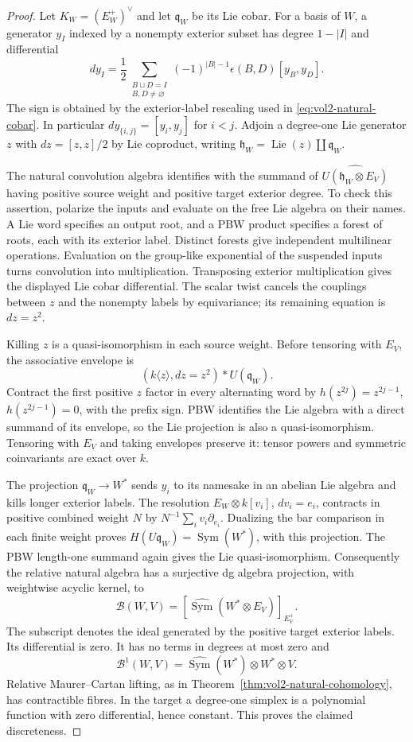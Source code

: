 \begin{proof}
Let $K_W=(E_W^+)^\vee$ and let $\mathfrak q_W$ be its Lie
cobar. For a basis of $W$, a generator $y_I$ indexed by a
nonempty exterior subset has degree $1-|I|$ and differential
\[
 dy_I=\frac12\sum_{\substack{B\sqcup D=I\\B,D\ne\varnothing}}
       (-1)^{|B|-1}\epsilon(B,D)[y_B,y_D].
\]
The sign is obtained by the exterior-label rescaling used in
\eqref{eq:vol2-natural-cobar}. In particular
$dy_{\{i,j\}}=[y_i,y_j]$ for $i<j$.
Adjoin a degree-one Lie generator $z$ with
$dz=[z,z]/2$ by Lie coproduct, writing
$\mathfrak h_W=\operatorname{Lie}(z)\amalg\mathfrak q_W$.

The natural convolution algebra identifies with the summand
of $\widehat{U(\mathfrak h_W\otimes E_V)}$ having positive
source weight and positive target exterior degree. To check
this assertion, polarize the inputs and evaluate on the free
Lie algebra on their names. A Lie word specifies an output
root, and a PBW product specifies a forest of roots, each with
its exterior label. Distinct forests give independent
multilinear operations. Evaluation on the group-like exponential
of the suspended inputs turns convolution into multiplication.
Transposing exterior multiplication gives the displayed Lie
cobar differential. The scalar twist cancels the couplings
between $z$ and the nonempty labels by equivariance; its
remaining equation is $dz=z^2$.

Killing $z$ is a quasi-isomorphism in each source weight.
Before tensoring with $E_V$, the associative envelope is
\[
 (k\langle z\rangle,dz=z^2)*U(\mathfrak q_W).
\]
Contract the first positive $z$ factor in every alternating
word by $h(z^{2j})=z^{2j-1}$, $h(z^{2j-1})=0$, with the
prefix sign. PBW identifies the Lie algebra with a direct
summand of its envelope, so the Lie projection is also a
quasi-isomorphism. Tensoring with $E_V$ and taking envelopes
preserve it: tensor powers and symmetric coinvariants are
exact over $k$.

The projection $\mathfrak q_W\to W^*$ sends $y_i$ to its
namesake in an abelian Lie algebra and kills longer exterior
labels. The resolution
$E_W\otimes k[v_i]$, $dv_i=e_i$, contracts in positive
combined weight $N$ by $N^{-1}\sum_i v_i\partial_{e_i}$.
Dualizing the bar comparison in each finite weight proves
$H(U\mathfrak q_W)=\operatorname{Sym}(W^*)$, with this
projection. The PBW length-one summand again gives the Lie
quasi-isomorphism. Consequently the relative natural algebra
has a surjective dg algebra projection, with weightwise
acyclic kernel, to
\[
 \mathcal B(W,V)=
 \left[\widehat{\operatorname{Sym}}(W^*\otimes E_V)
                         \right]_{E_V^+}.
\]
The subscript denotes the ideal generated by the positive
target exterior labels. Its differential is zero. It has
no terms in degrees at most zero and
\[
 \mathcal B^1(W,V)=
 \widehat{\operatorname{Sym}}(W^*)\otimes W^*\otimes V.
\]
Relative Maurer--Cartan lifting, as in
Theorem~\ref{thm:vol2-natural-cohomology}, has contractible
fibres. In the target a degree-one simplex is a polynomial
function with zero differential, hence constant. This proves
the claimed discreteness.


\end{proof}
